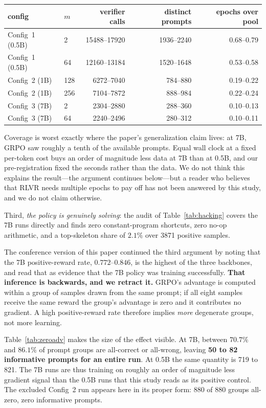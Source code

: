 \begin{center}
\begin{tabular}{llrrr}
\toprule
config & $m$ & verifier calls & distinct prompts & epochs over pool \\
\midrule
Config~1 (0.5B) & 2   & 15488--17920 & 1936--2240 & 0.68--0.79 \\
Config~1 (0.5B) & 64  & 12160--13184 & 1520--1648 & 0.53--0.58 \\
Config~2 (1B)   & 128 & 6272--7040   & 784--880   & 0.19--0.22 \\
Config~2 (1B)   & 256 & 7104--7872   & 888--984   & 0.22--0.24 \\
Config~3 (7B)   & 2   & 2304--2880   & 288--360   & 0.10--0.13 \\
Config~3 (7B)   & 64  & 2240--2496   & 280--312   & 0.10--0.11 \\
\bottomrule
\end{tabular}
\end{center}

Coverage is worst exactly where the paper's generalization claim lives: at 7B,
GRPO saw roughly a tenth of the available prompts. Equal wall clock at a fixed
per-token cost buys an order of magnitude less data at 7B than at 0.5B, and our
pre-registration fixed the seconds rather than the data. We do not think this
explains the result---the argument continues below---but a reader who believes
that RLVR needs multiple epochs to pay off has not been answered by this study,
and we do not claim otherwise.

Third, \emph{the policy is genuinely solving}: the audit of
Table~\ref{tab:hacking} covers the 7B runs directly and finds zero
constant-program shortcuts, zero no-op arithmetic, and a top-skeleton share of
$2.1\%$ over 3871 positive samples.



The conference version of this paper continued the third argument by noting
that the 7B positive-reward rate, $0.772$--$0.846$, is the highest of the three
backbones, and read that as evidence that the 7B policy was training
successfully. \textbf{That inference is backwards, and we retract it.} GRPO's
advantage is computed within a group of samples drawn from the same prompt; if
all eight samples receive the same reward the group's advantage is zero and it
contributes no gradient. A high positive-reward rate therefore implies
\emph{more} degenerate groups, not more learning.

Table~\ref{tab:zeroadv} makes the size of the effect visible. At 7B, between
$70.7\%$ and $86.1\%$ of prompt groups are all-correct or all-wrong, leaving
\textbf{50 to 82 informative prompts for an entire run}. At 0.5B the same
quantity is 719 to 821. The 7B runs are thus training on roughly an order of
magnitude less gradient signal than the 0.5B runs that this study reads as its
positive control. The excluded Config~2 run appears here in its proper form:
$880$ of $880$ groups all-zero, zero informative prompts.

